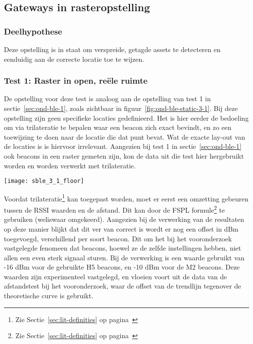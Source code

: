 \subsection{Gateways in rasteropstelling}
\label{sec:ond-ble-3}
\subsubsection{Deelhypothese}
Deze opstelling is in staat om verspreide, getagde assets te detecteren en eenduidig aan de correcte locatie toe te wijzen.

\subsubsection{Test 1: Raster in open, reële ruimte}
\label{sec:ond-ble-3-1}
\begin{minipage}{0.55\textwidth}
De opstelling voor deze test is analoog aan de opstelling van test 1 in sectie~\ref{sec:ond-ble-1}, zoals zichtbaar in figuur~\ref{fig:ond-ble-static-3-1}. Bij deze opstelling zijn geen specifieke locaties gedefinieerd. Het is hier eerder de bedoeling om via trilateratie te bepalen waar een beacon zich exact bevindt, en zo een toewijzing te doen naar de locatie die dat punt bevat. Wat de exacte lay-out van de locaties is is hiervoor irrelevant. Aangezien bij test 1 in sectie~\ref{sec:ond-ble-1} ook beacons in een raster gemeten zijn, kon de data uit die test hier hergebruikt worden en worden verwerkt met trilateratie. 
\end{minipage}
\hfill
\begin{minipage}{0.42\textwidth}
	\texttt{[image: sble\_3\_1\_floor]}
	\label{fig:ond-ble-static-3-1}
\end{minipage}

Voordat trilateratie\footnote{Zie Sectie~\ref{sec:lit-definities} op pagina~\pageref{sec:lit-definities}} kan toegepast worden, moet er eerst een omzetting gebeuren tussen de RSSI waarden en de afstand. Dit kan door de FSPL formule\footnote{Zie Sectie~\ref{sec:lit-definities} op pagina~\pageref{sec:lit-definities}} te gebruiken (weliswaar omgekeerd). Aangezien bij de verwerking van de resultaten op deze manier blijkt dat dit ver van correct is wordt er nog een offset in dBm toegevoegd, verschillend per soort beacon. Dit om het bij het vooronderzoek vastgelegde fenomeen dat beacons, hoewel ze de zelfde instellingen hebben, niet allen een even sterk signaal sturen. Bij de verwerking is een waarde gebruikt van -16 dBm voor de gebruikte H5 beacons, en -10 dBm voor de M2 beacons. Deze waarden zijn experimenteel vastgelegd, en vloeien voort uit de data van de afstandstest bij het vooronderzoek, waar de offset van de trendlijn tegenover de theoretische curve is gebruikt.


